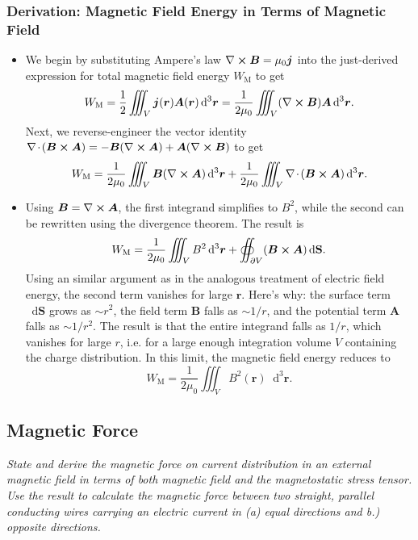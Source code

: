 \documentclass[11pt, a4paper]{article}
\newcommand{\diff}{\mathop{}\!\mathrm{d}} %
\newcommand{\dr}{\diff^{3} \r}  %
\renewcommand{\vec}[1]{\bm{#1}} %
\renewcommand{\r}{\vec{r}}
\newcommand{\B}{\vec{B}} %
\newcommand{\A}{\vec{A}} %
\renewcommand{\S}{\mathbf{S}}  %
\newcommand{\mm}{\mu_{0}}  %
\renewcommand{\j}{\vec{j}}  %
\renewcommand{\div}{\nabla \mspace{-2mu} \cdot \mspace{-2mu}}
\renewcommand{\curl}{\nabla \cross}
\begin{document}
\subsubsection{Derivation: Magnetic Field Energy in Terms of Magnetic Field}
\begin{itemize}
    \item We begin by substituting Ampere's law $ \curl \B = \mm \j $ into the just-derived expression for total magnetic field energy $ W_{\text{M}} $ to get
    \begin{equation*}
        W_{\text{M}} = \frac{1}{2} \iiint_{V} \j(\r) \A(\r) \dr = \frac{1}{2\mm}\iiint_{V}(\curl \B) \A \dr.
    \end{equation*}
    Next, we reverse-engineer the vector identity $ \div (\B \cross \A) = - \B (\curl \A) + \A (\curl \B) $ to get
    \begin{equation*}
        W_{\text{M}} = \frac{1}{2\mm} \iiint_{V} \B(\curl \A)\dr + \frac{1}{2\mm} \iiint_{V} \div (\B \cross \A) \dr.
    \end{equation*}
    \item Using $ \B = \curl \A $, the first integrand simplifies to $ B^{2} $, while the second can be rewritten using the divergence theorem. The result is
    \begin{equation*}
        W_{\text{M}} = \frac{1}{2\mm} \iiint_{V} B^{2} \dr + \oiint_{\partial V} (\B \cross \A) \diff \S.
    \end{equation*}
    Using an similar argument as in the analogous treatment of electric field energy, the second term vanishes for large $ \r $. Here's why: the surface term $ \diff \S $ grows as $ \sim r^{2} $, the field term $ \B $ falls as $ \sim 1/r $, and the potential term $ \A $ falls as $ \sim 1/r^{2} $. The result is that the entire integrand falls as $ 1/r $, which vanishes for large $ r $, i.e. for a large enough integration volume $ V $ containing the charge distribution. In this limit, the magnetic field energy reduces to
    \begin{equation*}
        W_{\text{M}} = \frac{1}{2\mm} \iiint_{V}B^{2}(\r)\dr.
    \end{equation*}
    
\end{itemize}

\subsection{Magnetic Force}
\textit{State and derive the magnetic force on current distribution in an external magnetic field in terms of both magnetic field and the magnetostatic stress tensor. Use the result to calculate the magnetic force between two straight, parallel conducting wires carrying an electric current in (a) equal directions and b.) opposite directions.}
\end{document}
